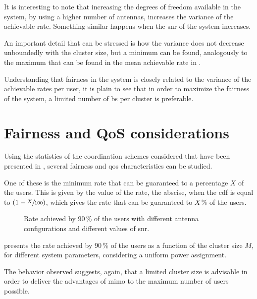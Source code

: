 It is interesting to note that increasing the degrees of freedom available in
the system, by using a higher number of antennas, increases the variance of the
achievable rate. Something similar happens when the \gls{snr} of the system
increases.

An important detail that can be stressed is how the variance does not decrease
unboundedly with the cluster size, but a minimum can be found, analogously to
the maximum that can be found in the mean achievable rate in
.

Understanding that fairness in the system is closely related to the variance of
the achievable rates per user, it is plain to see that in order to maximize the
fairness of the system, a limited number of \gls{bs} per cluster is preferable.

\section{Fairness and QoS considerations}\label{sec:stats_fairnes_qos}

Using the statistics of the coordination schemes considered that have been
presented in , several fairness and \gls{qos}
characteristics can be studied.

One of these is the minimum rate that can be guaranteed to a percentage $X$ of
the users. This is given by the value of the rate, the abscise, when the
\gls{cdf} is equal to $\left(1 - \sfrac{X}{100}\right)$, which gives the rate
that can be guaranteed to $X$\,\% of the users.

\begin{figure}[t]
\begin{center}
    \dummybox
\end{center}
\caption{Rate achieved by 90\,\% of the users with different antenna
configurations and different values of \gls{snr}.}
\label{fig:min_rate_sys_param}
\end{figure}

 presents the rate achieved by 90\,\% of the users
as a function of the cluster size $M$, for different system parameters,
considering a uniform power assignment.

The behavior observed suggests, again, that a limited cluster size is advisable
in order to deliver the advantages of \gls{mimo} to the maximum number of users
possible.

